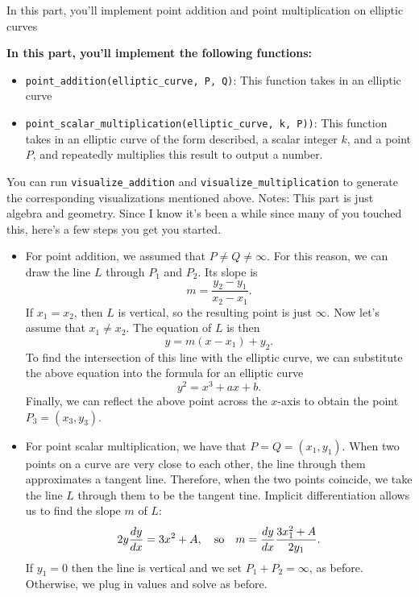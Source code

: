 \documentclass{article}
\begin{document}
\begin{tcolorbox}
    In this part, you'll implement point addition and point multiplication on elliptic curves

    
    \textbf{In this part, you'll implement the following functions:}
    \begin{itemize}
        \item \lstinline{point_addition(elliptic_curve, P, Q)}: This function takes in an elliptic curve 
        \item \lstinline{point_scalar_multiplication(elliptic_curve, k, P))}: This function takes in an elliptic curve of the form described, a scalar integer $k$, and a point $P$, and repeatedly multiplies this result to output a number.
    \end{itemize}
    You can run \lstinline{visualize_addition} and \lstinline{visualize_multiplication} to generate the corresponding visualizations mentioned above. 
    Notes: This part is just algebra and geometry. Since I know it's been a while since many of you touched this, here's a few steps you get you started.
    \begin{itemize}
        \item For point addition, we assumed that $P \ne Q \ne \infty$. For this reason, we can draw the line $L$ through $P_{1}$ and $P_{2}$. Its slope is $$m = \frac{y_{2} - y_{1}}{x_{2} - x_{1}}.$$ If $x_{1} = x_{2}$, then $L$ is vertical, so the resulting point is just $\infty$. Now let's assume that $x_{1} \ne x_{2}$. The equation of $L$ is then $$y = m(x - x_{1}) + y_{2}.$$ To find the intersection of this line with the elliptic curve, we can substitute the above equation into the formula for an elliptic curve $$y^{2} = x^{3} + ax + b.$$ Finally, we can reflect the above point across the $x$-axis to obtain the point $P_{3} = (x_{3}, y_{3})$.
        \item For point scalar multiplication, we have that $P = Q = (x_{1}, y_{1})$. When two points on a curve are very close to each other, the line through them approximates a tangent line. Therefore, when the two points coincide, we take the line $L$ through them to be the tangent tine. Implicit differentiation allows us to find the slope $m$ of $L$: $$2y \frac{dy}{dx} = 3x^{2} + A,\text{\quad so\quad} m = \frac{dy}{dx}\frac{3x_{1}^{2} + A}{2y_{1}}.$$ If $y_{1} = 0$ then the line is vertical and we set $P_{1} + P_{2} = \infty$, as before. Otherwise, we plug in values and solve as before.
    \end{itemize}
    
\end{tcolorbox}
\end{document}
